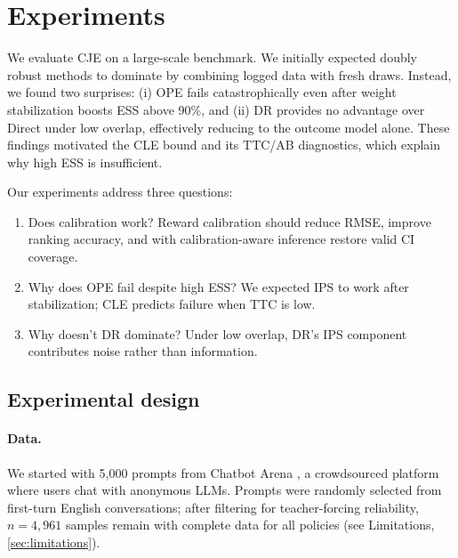 \section{Experiments}
\label{sec:experiments}

We evaluate CJE on a large-scale benchmark. We initially expected doubly robust methods to dominate by combining logged data with fresh draws. Instead, we found two surprises: (i) OPE fails catastrophically even after weight stabilization boosts ESS above 90\%, and (ii) DR provides no advantage over Direct under low overlap, effectively reducing to the outcome model alone. These findings motivated the CLE bound and its TTC/AB diagnostics, which explain why high ESS is insufficient.

Our experiments address three questions:
\begin{enumerate}[leftmargin=*,itemsep=2pt,topsep=2pt]
\item Does calibration work? Reward calibration should reduce RMSE, improve ranking accuracy, and with calibration-aware inference restore valid CI coverage.
\item Why does OPE fail despite high ESS? We expected IPS to work after stabilization; CLE predicts failure when TTC is low.
\item Why doesn't DR dominate? Under low overlap, DR's IPS component contributes noise rather than information.
\end{enumerate}

\subsection{Experimental design}
\label{ssec:exp-setup}

\paragraph{Data.}
We started with 5,000 prompts from Chatbot Arena \citep{Zheng2023LLMasJudge}, a crowdsourced platform where users chat with anonymous LLMs. Prompts were randomly selected from first-turn English conversations; after filtering for teacher-forcing reliability, $n{=}4{,}961$ samples remain with complete data for all policies (see Limitations, \cref{sec:limitations}).

